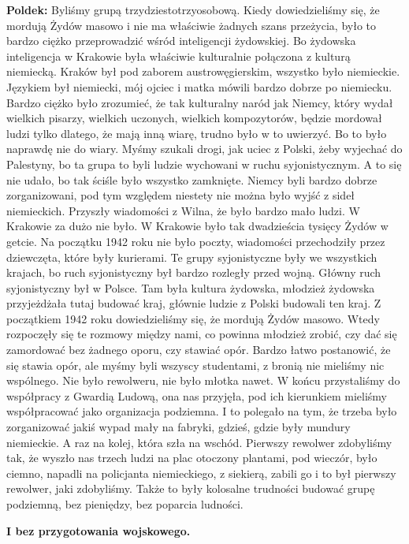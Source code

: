 \begin{otherlanguage}{polish}
\textbf{Poldek:} Byliśmy grupą trzydziestotrzyosobową. Kiedy dowiedzieliśmy się, że mordują Żydów masowo i nie ma właściwie żadnych szans przeżycia, było to bardzo ciężko przeprowadzić wśród inteligencji żydowskiej. Bo żydowska inteligencja w Krakowie była właściwie kulturalnie połączona z kulturą niemiecką. Kraków był pod zaborem austrowęgierskim, wszystko było niemieckie. Językiem był niemiecki, mój ojciec i matka mówili bardzo dobrze po niemiecku. Bardzo ciężko było zrozumieć, że tak kulturalny naród jak Niemcy, który wydał wielkich pisarzy, wielkich uczonych, wielkich kompozytorów, będzie mordował ludzi tylko dlatego, że mają inną wiarę, trudno było w to uwierzyć. Bo to było naprawdę nie do wiary. Myśmy szukali drogi, jak uciec z Polski, żeby wyjechać do Palestyny, bo ta grupa to byli ludzie wychowani w ruchu syjonistycznym. A to się nie udało, bo tak ściśle było wszystko zamknięte. Niemcy byli bardzo dobrze zorganizowani, pod tym względem niestety nie można było wyjść z sideł niemieckich. Przyszły wiadomości z Wilna, że było bardzo mało ludzi. W Krakowie za dużo nie było. W Krakowie było tak dwadzieścia tysięcy Żydów w getcie. Na początku 1942 roku nie było poczty, wiadomości przechodziły przez dziewczęta, które były kurierami. Te grupy syjonistyczne były we wszystkich krajach, bo ruch syjonistyczny był bardzo rozległy przed wojną. Główny ruch syjonistyczny był w Polsce. Tam była kultura żydowska, młodzież żydowska przyjeżdżała tutaj budować kraj, głównie ludzie z Polski budowali ten kraj. Z początkiem 1942 roku dowiedzieliśmy się, że mordują Żydów masowo. Wtedy rozpoczęły się te rozmowy między nami, co powinna młodzież zrobić, czy dać się zamordować bez żadnego oporu, czy stawiać opór. Bardzo łatwo postanowić, że się stawia opór, ale myśmy byli wszyscy studentami, z bronią nie mieliśmy nic 
wspólnego. Nie było rewolweru, nie było młotka nawet. W końcu przystaliśmy do współpracy z Gwardią Ludową, ona nas przyjęła, pod ich kierunkiem mieliśmy współpracować jako organizacja podziemna. I to polegało na tym, że trzeba było zorganizować jakiś wypad mały na fabryki, gdzieś, gdzie były mundury niemieckie. A raz na kolej, która szła na wschód. Pierwszy rewolwer zdobyliśmy tak, że wyszło nas trzech ludzi na plac otoczony plantami, pod wieczór, było ciemno, napadli na policjanta niemieckiego, z siekierą, zabili go i to był pierwszy rewolwer, jaki zdobyliśmy. Także to były kolosalne trudności budować grupę podziemną, bez pieniędzy, bez poparcia ludności.

\textbf{I bez przygotowania wojskowego.}


\end{otherlanguage}
